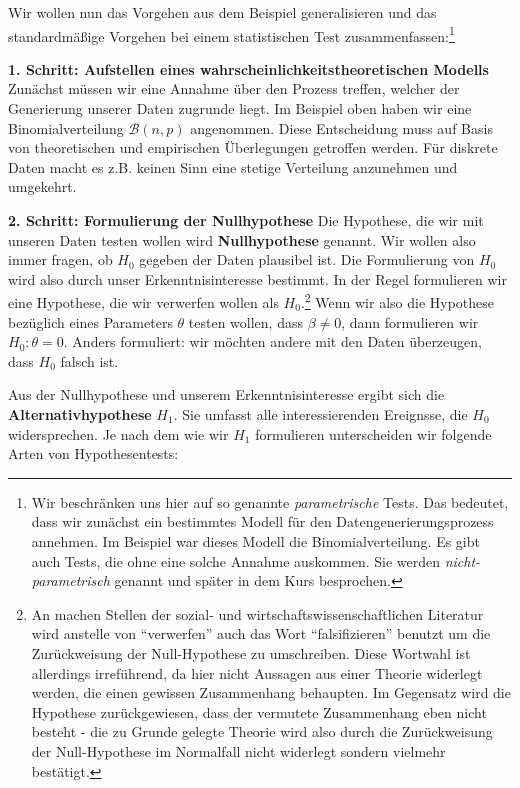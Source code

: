\documentclass[]{book}
\let\rmarkdownfootnote\footnote%
\def\footnote{\protect\rmarkdownfootnote}
\begin{document}
Wir wollen nun das Vorgehen aus dem Beispiel generalisieren und das
standardmäßige Vorgehen bei einem statistischen Test
zusammenfassen:\footnote{Wir beschränken uns hier auf so genannte
  \emph{parametrische} Tests. Das bedeutet, dass wir zunächst ein
  bestimmtes Modell für den Datengenerierungsprozess annehmen. Im
  Beispiel war dieses Modell die Binomialverteilung. Es gibt auch Tests,
  die ohne eine solche Annahme auskommen. Sie werden
  \emph{nicht-parametrisch} genannt und später in dem Kurs besprochen.}

\textbf{1. Schritt: Aufstellen eines wahrscheinlichkeitstheoretischen
Modells} Zunächst müssen wir eine Annahme über den Prozess treffen,
welcher der Generierung unserer Daten zugrunde liegt. Im Beispiel oben
haben wir eine Binomialverteilung \(\mathcal{B}(n,p)\) angenommen. Diese
Entscheidung muss auf Basis von theoretischen und empirischen
Überlegungen getroffen werden. Für diskrete Daten macht es z.B. keinen
Sinn eine stetige Verteilung anzunehmen und umgekehrt.

\textbf{2. Schritt: Formulierung der Nullhypothese} Die Hypothese, die
wir mit unseren Daten testen wollen wird \textbf{Nullhypothese} genannt.
Wir wollen also immer fragen, ob \(H_0\) gegeben der Daten plausibel
ist. Die Formulierung von \(H_0\) wird also durch unser
Erkenntnisinteresse bestimmt. In der Regel formulieren wir eine
Hypothese, die wir verwerfen wollen als \(H_0\).\footnote{An machen
  Stellen der sozial- und wirtschaftswissenschaftlichen Literatur wird
  anstelle von ``verwerfen'' auch das Wort ``falsifizieren'' benutzt um
  die Zurückweisung der Null-Hypothese zu umschreiben. Diese Wortwahl
  ist allerdings irreführend, da hier nicht Aussagen aus einer Theorie
  widerlegt werden, die einen gewissen Zusammenhang behaupten. Im
  Gegensatz wird die Hypothese zurückgewiesen, dass der vermutete
  Zusammenhang eben nicht besteht - die zu Grunde gelegte Theorie wird
  also durch die Zurückweisung der Null-Hypothese im Normalfall nicht
  widerlegt sondern vielmehr bestätigt.} Wenn wir also die Hypothese
bezüglich eines Parameters \(\theta\) testen wollen, dass
\(\beta\neq 0\), dann formulieren wir \(H_0: \theta = 0\). Anders
formuliert: wir möchten andere mit den Daten überzeugen, dass \(H_0\)
falsch ist.

Aus der Nullhypothese und unserem Erkenntnisinteresse ergibt sich die
\textbf{Alternativhypothese} \(H_1\). Sie umfasst alle interessierenden
Ereignsse, die \(H_0\) widersprechen. Je nach dem wie wir \(H_1\)
formulieren unterscheiden wir folgende Arten von Hypothesentests:
\end{document}
